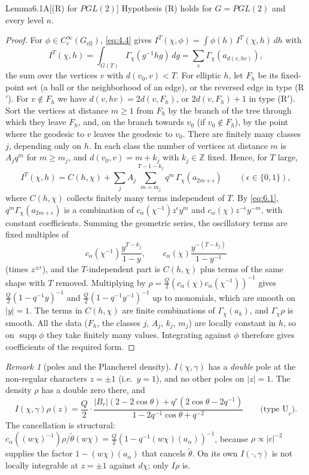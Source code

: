 \documentclass[12pt,letterpaper]{article}
\numberwithin{equation}{section}
\theoremstyle{plain}
\theoremstyle{remark}
\newtheorem{remarkn}[lemma]{Remark}%
\theoremstyle{plain}
\theoremstyle{definition}
\theoremstyle{remark}
\theoremstyle{remark}
\DeclareMathOperator{\supp}{supp}
\newcommand{\ellr}{\mathrm{ell}}
\begin{document}
\begin{fixedplain}{Lemma}{6.1A}[(R) for $PGL(2)$]\label{lem:6.1A}
Hypothesis (R) holds for $G=PGL(2)$ and every level $n$.
\end{fixedplain}

\begin{proof}
For $\phi\in C_c^\infty(G_{\ellr})$, \eqref{eq:4.4} gives $I^T(\chi,\phi)=\int\phi(h)\,I^T(\chi,h)\,dh$ with
\[
I^T(\chi,h)=\int_{G(T)}\Gamma_\chi(g^{-1}hg)\,dg=\sum_v\Gamma_\chi(a_{d(v,hv)}),
\]
the sum over the vertices $v$ with $d(v_0,v)<T$. For elliptic $h$, let $F_h$ be its fixed-point set (a ball or the neighborhood of an edge), or the reversed edge in type (R$'$). For $v\notin F_h$ we have $d(v,hv)=2d(v,F_h)$, or $2d(v,F_h)+1$ in type (R$'$). Sort the vertices at distance $m\ge1$ from $F_h$ by the branch of the tree through which they leave $F_h$, and, on the branch towards $v_0$ (if $v_0\notin F_h$), by the point where the geodesic to $v$ leaves the geodesic to $v_0$. There are finitely many classes $j$, depending only on $h$. In each class the number of vertices at distance $m$ is $A_jq^m$ for $m\ge m_j$, and $d(v_0,v)=m+k_j$ with $k_j\in\mathbb{Z}$ fixed. Hence, for $T$ large,
\[
I^T(\chi,h)=C(h,\chi)+\sum_j A_j\sum_{m=m_j}^{T-1-k_j}q^m\,\Gamma_\chi(a_{2m+\epsilon})\qquad(\epsilon\in\{0,1\}),
\]
where $C(h,\chi)$ collects finitely many terms independent of $T$. By \eqref{eq:6.1}, $q^m\Gamma_\chi(a_{2m+\epsilon})$ is a combination of $c_\alpha(\chi^{-1})z^\epsilon y^m$ and $c_\alpha(\chi)z^{-\epsilon}y^{-m}$, with constant coefficients. Summing the geometric series, the oscillatory terms are fixed multiples of
\[
c_\alpha(\chi^{-1})\frac{y^{T-k_j}}{1-y},\qquad c_\alpha(\chi)\frac{y^{-(T-k_j)}}{1-y^{-1}}
\]
(times $z^{\pm\epsilon}$), and the $T$-independent part is $C(h,\chi)$ plus terms of the same shape with $T$ removed. Multiplying by $\rho=\frac Q2(c_\alpha(\chi)c_\alpha(\chi^{-1}))^{-1}$ gives $\frac Q2(1-q^{-1}y)^{-1}$ and $\frac Q2(1-q^{-1}y^{-1})^{-1}$ up to monomials, which are smooth on $|y|=1$. The terms in $C(h,\chi)$ are finite combinations of $\Gamma_\chi(a_k)$, and $\Gamma_\chi\rho$ is smooth. All the data ($F_h$, the classes $j$, $A_j$, $k_j$, $m_j$) are locally constant in $h$, so on $\supp \phi$ they take finitely many values. Integrating against $\phi$ therefore gives coefficients of the required form.
\end{proof}

\begin{remarkn}[poles and the Plancherel density]\label{rem:6.2}
$I(\chi,\gamma)$ has a \emph{double} pole at the non-regular characters $z=\pm1$ (i.e.\ $y=1$), and no other poles on $|z|=1$. The density $\rho$ has a double zero there, and
\[
I(\chi,\gamma)\rho(z)=\frac Q2\cdot\frac{|B_r|(2-2\cos\theta)+q^r(2\cos\theta-2q^{-1})}{1-2q^{-1}\cos\theta+q^{-2}}\qquad\text{(type U}_r).
\]
The cancellation is structural: $c_\alpha((w\chi)^{-1})\rho/\tilde\theta(w\chi)=\frac Q2(1-q^{-1}(w\chi)(a_\alpha))^{-1}$, because $\rho\propto|c|^{-2}$ supplies the factor $1-(w\chi)(a_\alpha)$ that cancels $\tilde\theta$. On its own $I(\cdot,\gamma)$ is not locally integrable at $z=\pm1$ against $d\chi$; only $I\rho$ is.
\end{remarkn}
\end{document}
